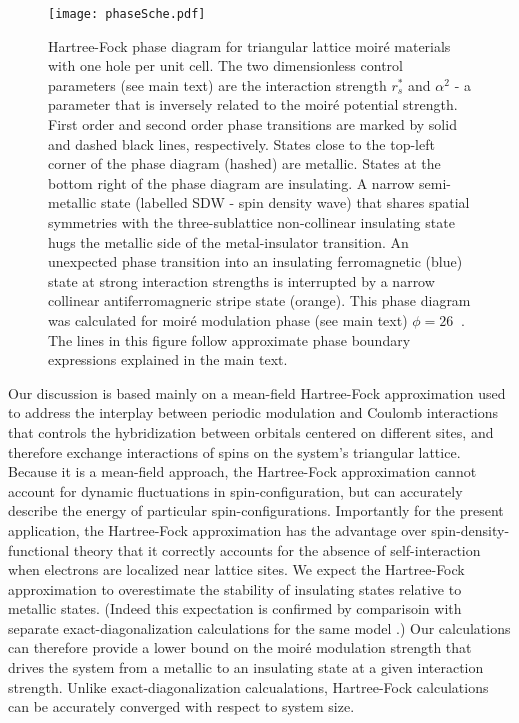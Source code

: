 \documentclass[%
 reprint,
 superscriptaddress,
 amsmath,amssymb,
 aps,
 prx,
 floatfix,
]{revtex4-2}
\newcommand{\<}{\langle}
\renewcommand{\>}{\rangle}
\renewcommand{\(}{\left(}
\renewcommand{\)}{\right)}
\renewcommand{\[}{\left[}
\renewcommand{\]}{\right]}
\DeclareMathOperator{\degree}{^{\circ}}
\begin{document}
\begin{figure}[t]
    \centering
    \texttt{[image: phaseSche.pdf]}
    \caption{Hartree-Fock phase diagram for triangular lattice moir\'e materials 
    with one hole per unit cell. The two dimensionless control parameters (see main text)
    are the interaction strength $r_s^*$ and $\alpha^2$ - a parameter that 
    is inversely related to the moir\'e potential strength. 
    First order and second order phase transitions are marked by solid and dashed black lines,  respectively. States close to the top-left corner of the phase diagram (hashed) are metallic. States at the bottom right of the phase diagram are insulating.  A narrow semi-metallic state (labelled SDW - spin density wave) 
    that shares spatial symmetries with the three-sublattice non-collinear insulating state 
    hugs the metallic side of the metal-insulator transition. 
    An unexpected phase transition into an insulating ferromagnetic (blue) state at strong interaction strengths
    is interrupted by a narrow collinear antiferromagneric stripe state (orange). This phase diagram was calculated 
    for moir\'e modulation phase (see main text) $\phi=26\degree$.  The lines in this figure follow approximate phase boundary 
    expressions explained in the main text.
    }
    \label{fig:phaseD}
\end{figure}

Our discussion is based mainly on a mean-field Hartree-Fock approximation
used to address the interplay between periodic modulation
and Coulomb interactions that controls the hybridization 
between orbitals centered on different sites, and 
therefore exchange interactions of spins on the system's triangular lattice.  
Because it is a mean-field approach, the Hartree-Fock approximation
cannot account for dynamic fluctuations in spin-configuration,
but can accurately describe the energy of particular spin-configurations.  
Importantly for the present application, the Hartree-Fock approximation has the advantage over 
spin-density-functional theory \cite{liangfuCTI} 
that it correctly accounts for the absence of 
self-interaction \cite{selfInt81} when electrons are localized near lattice sites.
We expect the Hartree-Fock approximation to overestimate the stability of insulating states 
relative to metallic states. (Indeed this expectation is confirmed by comparisoin with separate exact-diagonalization calculations for the same model \cite{nicolas2020ed}.) 
Our calculations can therefore provide a lower bound on the 
moir\'e modulation strength that drives the system from a metallic to an insulating state
at a given interaction strength.  Unlike exact-diagonalization calcualations, Hartree-Fock calculations can be accurately converged with respect to system size.
\end{document}
